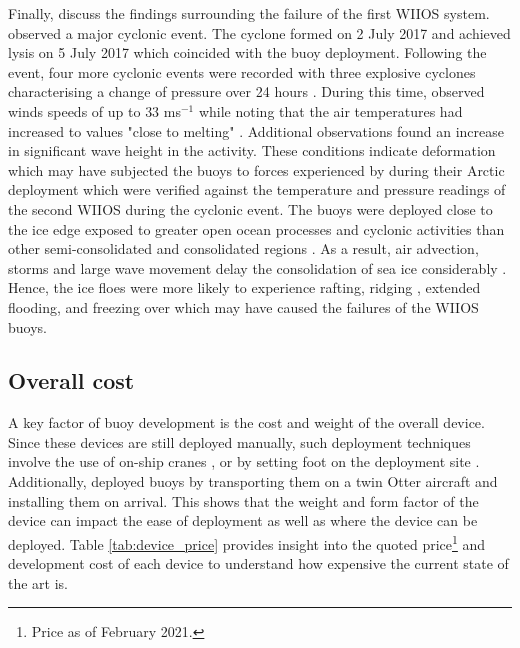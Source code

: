 Finally, \textcite{vichi2019effects} discuss the findings surrounding the failure of the first WIIOS system. \textcite{vichi2019effects} observed a major cyclonic event. The cyclone formed on  2 July 2017 and achieved lysis on 5 July 2017 which coincided with the buoy deployment. Following the event, four more cyclonic events were recorded with three explosive cyclones characterising a change of pressure over 24 hours \cite{vichi2019effects}. During this time, \textcite{vichi2019effects} observed winds speeds of up to $33$ ms$^{-1}$ while noting that the air temperatures had increased to values "close to melting" \cite{vichi2019effects}. Additional observations found an increase in significant wave height in the activity. These conditions indicate deformation \cite{vichi2019effects} which may have subjected the buoys to forces experienced by \textcite{doble2017robust} during their Arctic deployment which were verified against the temperature and pressure readings of the second WIIOS during the cyclonic event. The buoys were deployed close to the ice edge exposed to greater open ocean processes and cyclonic activities than other semi-consolidated and consolidated regions \cite{vichi2019effects}. As a result, air advection, storms and large wave movement delay the consolidation of sea ice considerably \cite{vichi2019effects}. Hence, the ice floes were more likely to experience rafting, ridging \cite{icedefinition1992}, extended flooding, and freezing over which may have caused the failures of the WIIOS buoys.

\subsection{Overall cost}
\label{subsec:sec2_overallcost}
A key factor of buoy development is the cost and weight of the overall device. Since these devices are still deployed manually, such deployment techniques involve the use of on-ship cranes \cite{alberello2019drift,kohout2015device}, or by setting foot on the deployment site \cite{PLANCK2019102792,rabault2019open}. Additionally, \textcite{doble2017robust} deployed buoys by transporting them on a twin Otter aircraft and installing them on arrival. This shows that the weight and form factor of the device can impact the ease of deployment as well as where the device can be deployed. Table \ref{tab:device_price} provides insight into the quoted price\footnote[1]{Price as of February 2021.} and development cost of each device to understand how expensive the current state of the art is.

